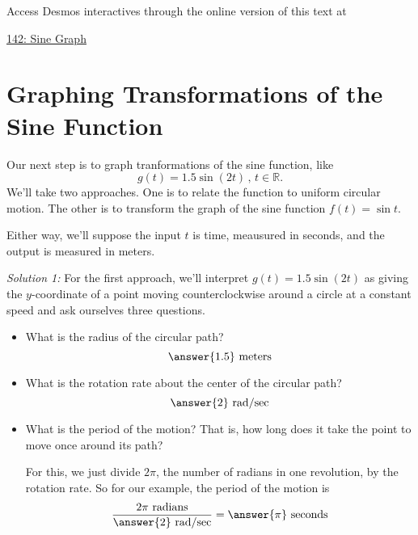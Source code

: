 \documentclass{ximera}
\begin{document}
\begin{exploration}
Access Desmos interactives through the online version of this text at
 
\href{https://www.desmos.com/calculator/lurdcthxqu}{142: Sine Graph}

 
\begin{onlineOnly}
    \begin{center}
\end{center}
\end{onlineOnly}
\end{exploration}


\section{Graphing Transformations of the Sine Function}
\begin{example} \label{Ed7ugg}

Our next step is to graph tranformations of the sine function, like
\[
    g(t) = 1.5\sin (2t) \, , \, t\in \mathbb{R} .
\]
We'll take two approaches. One is to relate the function to uniform circular motion. The other is to transform the graph of the sine function $f(t) = \sin t$. 

Either way, we'll suppose the input $t$ is time, meausured in seconds, and the output is measured in meters. 


\emph{ Solution 1:} For the first approach, we'll interpret $g(t) = 1.5 \sin (2t)$ as giving the $y$-coordinate of a point moving counterclockwise around a circle at a constant speed and ask ourselves three questions.

\begin{itemize}
\item{
\begin{question} \label{Qdst656}
What is the radius of the circular path?  
\[
\answer{1.5} \text{ meters}
\]
\end{question}
}

\item{
\begin{question}  \label{Qdfsatt56}
What is the rotation rate about the center of the circular path?
\[
 \answer{2} \text{ rad/sec}
\]
\end{question}
}

\item{
\begin{question}  \label{Qdfsdsg56}
What is the period of the motion? That is, how long does it take the point to move once around its path?

For this, we just divide $2\pi$, the number of radians in one revolution, by the rotation rate. So for our example, the period of the motion is
\[
    \frac{2\pi \text{ radians}}{\answer{2}\text{ rad/sec}}   = \answer{\pi} \text{ seconds}
\]
\end{question}
}
\end{itemize}


\end{example}
\end{document}
